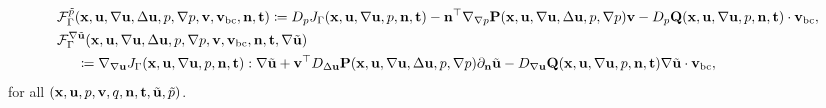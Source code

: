 \documentclass[oneside]{book}
\numberwithin{equation}{section}
\begin{document}
\begin{itemize}[leftmargin=0in]
\begin{align*}
        &\mathcal{F}_\Gamma^{\tilde{p}}({\bf x},{\bf u},\nabla{\bf u},\Delta{\bf u},p,\nabla p,{\bf v},{\bf v}_{\rm bc},{\bf n},{\bf t})\coloneqq D_pJ_\Gamma({\bf x},{\bf u},\nabla{\bf u},p,{\bf n},{\bf t}) - {\bf n}^\top\nabla_{\nabla p}{\bf P}({\bf x},{\bf u},\nabla{\bf u},\Delta{\bf u},p,\nabla p){\bf v} - D_p{\bf Q}({\bf x},{\bf u},\nabla{\bf u},p,{\bf n},{\bf t})\cdot{\bf v}_{\rm bc},\\
        &\mathcal{F}_\Gamma^{\nabla\tilde{\bf u}}({\bf x},{\bf u},\nabla{\bf u},\Delta{\bf u},p,\nabla p,{\bf v},{\bf v}_{\rm bc},{\bf n},{\bf t},\nabla\tilde{\bf u})\\
        &\hspace{5mm}\coloneqq\nabla_{\nabla{\bf u}}J_\Gamma({\bf x},{\bf u},\nabla{\bf u},p,{\bf n},{\bf t}):\nabla\tilde{\bf u} + {\bf v}^\top D_{\Delta{\bf u}}{\bf P}({\bf x},{\bf u},\nabla{\bf u},\Delta{\bf u},p,\nabla p)\partial_{\bf n}\tilde{\bf u} - D_{\nabla{\bf u}}{\bf Q}({\bf x},{\bf u},\nabla{\bf u},p,{\bf n},{\bf t})\nabla\tilde{\bf u}\cdot{\bf v}_{\rm bc},
    \end{align*}
    for all $({\bf x},{\bf u},p,{\bf v},q,{\bf n},{\bf t},\tilde{\bf u},\tilde{p})$.
    

\end{itemize}
\end{document}
